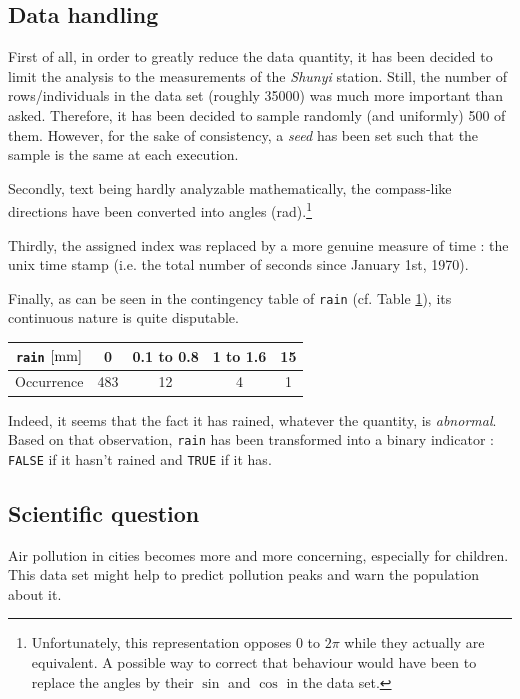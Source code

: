 \documentclass[a4paper, 12pt]{article}
\begin{document}
	\subsection{Data handling}
	First of all, in order to greatly reduce the data quantity, it has been decided to limit the analysis to the measurements of the \emph{Shunyi} station. Still, the number of rows/individuals in the data set (roughly \num{35000}) was much more important than asked. Therefore, it has been decided to sample randomly (and uniformly) \num{500} of them. However, for the sake of consistency, a \emph{seed} has been set such that the sample is the same at each execution. \par
	Secondly, text being hardly analyzable mathematically, the compass-like directions have been converted into angles (\si{\radian}).\footnote{Unfortunately, this representation opposes $0$ to $2\pi$ while they actually are equivalent. A possible way to correct that behaviour would have been to replace the angles by their $\sin$ and $\cos$ in the data set.} \par
	Thirdly, the assigned index was replaced by a more genuine measure of time : the unix time stamp (i.e. the total number of seconds since January 1st, 1970). \par
	Finally, as can be seen in the contingency table of \texttt{rain} (cf. Table \ref{tab:rain}), its continuous nature is quite disputable. \par
	\begin{table}[H]
	    \centering
	    \begin{tabular}{|c|c|c|c|c|}
	        \hline
	        \texttt{rain} $\left[\si{\milli\meter}\right]$ & \num{0} & \num{0.1} to \num{0.8} & \num{1} to \num{1.6} & \num{15} \\ \hline\hline
	        Occurrence & \num{483} & \num{12} & \num{4} & \num{1} \\ \hline
	    \end{tabular}
	    \label{tab:rain}
	\end{table}
	Indeed, it seems that the fact it has rained, whatever the quantity, is \emph{abnormal}. Based on that observation, \texttt{rain} has been transformed into a binary indicator : \texttt{FALSE} if it hasn't rained and \texttt{TRUE} if it has.
	\subsection{Scientific question}
	Air pollution in cities becomes more and more concerning, especially for children. This data set might help to predict pollution peaks and warn the population about it.
\end{document}
